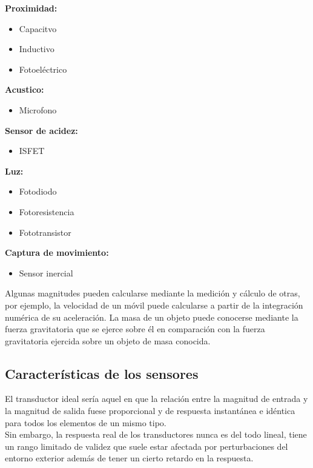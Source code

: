 \textbf{Proximidad:}
\begin{itemize}
  \item     Capacitvo
  \item     Inductivo
  \item     Fotoeléctrico
\end{itemize}

\textbf{Acustico:}
\begin{itemize}
  \item     Microfono
\end{itemize}

\textbf{Sensor de acidez:}
\begin{itemize}
  \item     ISFET
\end{itemize}

\textbf{Luz:}
\begin{itemize}
  \item     Fotodiodo
  \item     Fotoresistencia
  \item     Fototransistor
\end{itemize}

\textbf{Captura de movimiento:}
\begin{itemize}
  \item     Sensor inercial
\end{itemize}

Algunas magnitudes pueden calcularse mediante la medición y cálculo de otras, por ejemplo, la velocidad de un móvil puede calcularse a partir de la integración numérica de su 
aceleración. La masa de un objeto puede conocerse mediante la fuerza gravitatoria que se ejerce sobre él en comparación con la fuerza gravitatoria ejercida sobre un objeto de 
masa conocida. \\

\subsection{Características de los sensores}

El transductor  ideal  sería  aquel  en  que  la  relación  entre la magnitud de entrada y la 
magnitud de salida fuese proporcional y de respuesta instantánea e idéntica para todos los elementos de un mismo tipo. \\

Sin  embargo, la  respuesta  real  de  los  transductores  nunca  es del todo lineal, tiene un rango  limitado  de  validez que  suele  estar afectada por perturbaciones del entorno exterior además de tener un cierto retardo en la respuesta. \\

